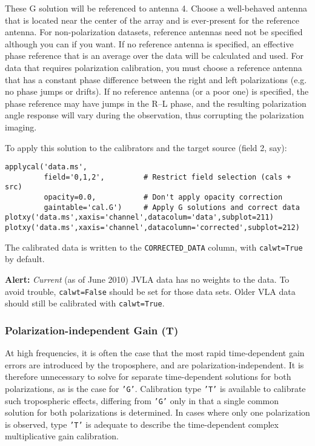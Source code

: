 These G solution will be referenced to antenna 4.  Choose a
well-behaved antenna that is located near the center of the array and
is ever-present for the reference antenna.  For non-polarization
datasets, reference antennas need not be specified although you can if
you want.  If no reference antenna is specified, an effective phase
reference that is an average over the data will be calculated and
used.  For data that requires polarization calibration, you must
choose a reference antenna that has a constant phase difference
between the right and left polarizations (e.g. no phase jumps or
drifts).  If no reference antenna (or a poor one) is specified, the
phase reference may have jumps in the R--L phase, and the resulting
polarization angle response will vary during the observation, thus
corrupting the polarization imaging.

To apply this solution to the calibrators and the target source (field
2, say):
\small
\begin{verbatim}
applycal('data.ms',
         field='0,1,2',         # Restrict field selection (cals + src)
         opacity=0.0,           # Don't apply opacity correction
         gaintable='cal.G')     # Apply G solutions and correct data
plotxy('data.ms',xaxis='channel',datacolum='data',subplot=211)
plotxy('data.ms',xaxis='channel',datacolumn='corrected',subplot=212)
\end{verbatim}
\normalsize
The calibrated data is written to the {\tt CORRECTED\_DATA} column, with 
{\tt calwt=True} by default.

{\bf Alert:} {\it Current} (as of June 2010)  JVLA data has no weights
to the data. To avoid trouble, {\tt calwt=False} should be set for
those data sets. Older VLA data should still be calibrated with  {\tt calwt=True}.

\subsubsection{Polarization-independent Gain (T)}
\label{section:cal.solve.gain.t}

At high frequencies, it is often the case that the most rapid
time-dependent gain errors are introduced by the troposphere, and are
polarization-independent.  It is therefore unnecessary to solve for
separate time-dependent solutions for both polarizations, as is the
case for {\tt 'G'}.  Calibration type {\tt 'T'} is available to calibrate such
tropospheric effects, differing from {\tt 'G'} only in that a single common
solution for both polarizations is determined.  In cases where only
one polarization is observed, type {\tt 'T'} is adequate to describe the
time-dependent complex multiplicative gain calibration.

